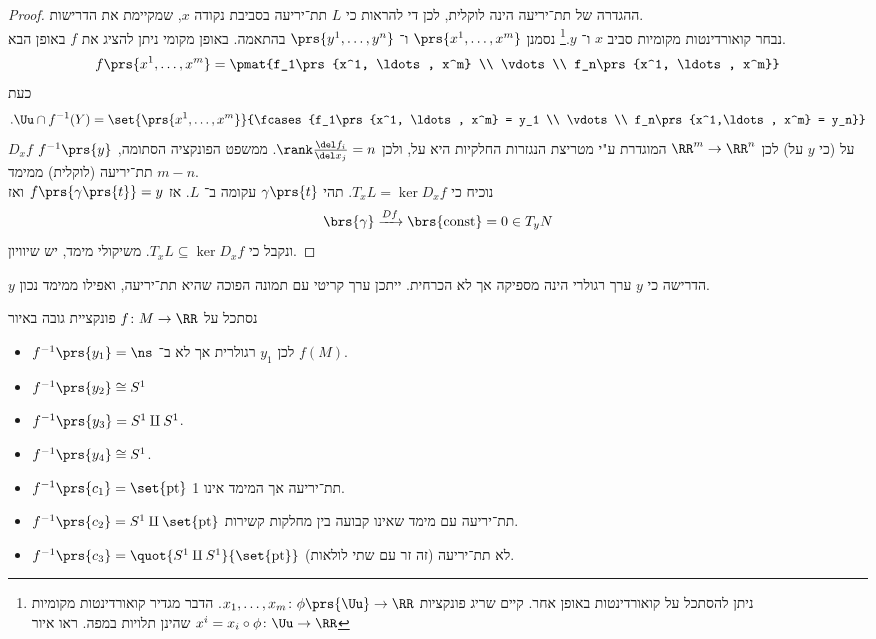 \documentclass[a4paper,10pt,twoside,openany]{book}
\begin{document}
\begin{proof}
ההגדרה של תת־יריעה הינה לוקלית, לכן די להראות כי
$L$
תת־יריעה בסביבת נקודה
$x$,
שמקיימת את הדרישות.\\
נבחר קואורדינטות מקומיות סביב
$x$
ו־%
$y$.\footnote{ניתן להסתכל על קואורדינטות באופן אחר. קיים שריג פונקציות
$x_1, \ldots, x_m \colon \phi\prs{\Uu} \to \RR$. הדבר מגדיר קואורדינטות מקומיות
$x^i = x_i \circ \phi \colon \Uu \to \RR$
שהינן תלויות במפה. ראו איור
}
נסמנן
$\prs{x^1, \ldots, x^m}$
ו־%
$\prs{y^1, \ldots, y^n}$
בהתאמה.
באופן מקומי ניתן להציג את
$f$
באופן הבא.
\[f\prs{x^1, \ldots, x^m} = \pmat{f_1\prs{x^1, \ldots, x^m} \\ \vdots \\ f_n\prs{x^1, \ldots, x^m}}\]
כעת
\[\text{.} \Uu \cap f^{-1}(Y) = \set{\prs{x^1, \ldots, x^m}}{\fcases{f_1\prs{x^1, \ldots, x^m} = y_1 \\ \vdots \\ f_n\prs{x^1,\ldots, x^m} = y_n}}\]
$D_x f$
על
(כי
$y$
על) לכן
$\RR^m \to \RR^n$
המוגדרת ע"י מטריצת הנגזרות החלקיות היא על, ולכן
$\rank \frac{\del f_i}{\del x_j} = n$.
ממשפט הפונקציה הסתומה,
$f^{-1}\prs{y}$
תת־יריעה (לוקלית) ממימד
$m-n$.\\
נוכיח כי
$T_xL = \ker D_x f$.
תהי
$\gamma\prs{t}$
עקומה ב־%
$L$.
אז
$f\prs{\gamma\prs{t}} = y$
ואז
\[\brs{\gamma} \xrightarrow{Df} \brs{\text{const}} = 0 \in T_y N\]
ונקבל כי
$T_x L \subseteq \ker D_x f$.
משיקולי מימד, יש שיוויון.
\end{proof}
\begin{remark}
$y$
הדרישה כי
$y$
ערך רגולרי
הינה מספיקה אך לא הכרחית.
ייתכן ערך קריטי עם תמונה הפוכה שהיא תת־יריעה, ואפילו ממימד נכון.
\end{remark}
\begin{example}
נסתכל על
$f \colon M \to \RR$
פונקציית גובה באיור
\begin{itemize}
\item
$f^{-1}\prs{y_1} = \ns$
לכן
$y_1$
רגולרית אך לא ב־%
$f(M)$.
\item
$f^{-1}\prs{y_2} \cong S^1$
\item $f^{-1}\prs{y_3} = S^1 \amalg S^1$.
\item $f^{-1}\prs{y_4} \cong S^1$.
\item $f^{-1}\prs{c_1} = \set{\text{pt}}$
תת־יריעה אך המימד אינו 1.
\item $f^{-1}\prs{c_2} = S^1 \amalg \set{\text{pt}}$
תת־יריעה עם מימד שאינו קבועה בין מחלקות קשירות.
\item $f^{-1}\prs{c_3} = \quot{S^1 \amalg S^1}{\set{\text{pt}}}$
לא תת־יריעה (זה זר עם שתי לולאות).
\end{itemize}
\end{example}
\end{document}
